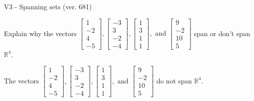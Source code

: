 \begin{exercise}
  \begin{exerciseTitle}V3 - Spanning sets (ver. 681)\end{exerciseTitle}
  \begin{exerciseStatement}
    Explain why the vectors \(\left[\begin{array}{r}
1 \\
-2 \\
4 \\
-5
\end{array}\right] , \left[\begin{array}{r}
-3 \\
3 \\
-2 \\
-4
\end{array}\right] , \left[\begin{array}{r}
1 \\
3 \\
1 \\
1
\end{array}\right] , \text{ and } \left[\begin{array}{r}
9 \\
-2 \\
10 \\
5
\end{array}\right]\) span or don't span \(\mathbb{R}^4\). 
	


  \end{exerciseStatement}
  \begin{exerciseAnswer}
   The vectors \(\left[\begin{array}{r}
1 \\
-2 \\
4 \\
-5
\end{array}\right] , \left[\begin{array}{r}
-3 \\
3 \\
-2 \\
-4
\end{array}\right] , \left[\begin{array}{r}
1 \\
3 \\
1 \\
1
\end{array}\right] , \text{ and } \left[\begin{array}{r}
9 \\
-2 \\
10 \\
5
\end{array}\right]\) 
  	 do not  
	span \(\mathbb{R}^4\).
  


  \end{exerciseAnswer}
\end{exercise}